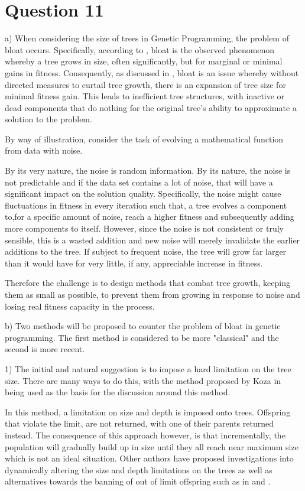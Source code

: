 \documentclass[12pt]{article}
\begin{document}
\section{Question 11}
a) When considering the size of trees in Genetic Programming, the problem of bloat occurs. Specifically, according to \cite{poli_langdon_mcphee_koza_2008}, bloat is the observed phenomenon whereby a tree grows in size, often significantly, but for marginal or minimal gains in fitness. Consequently, as discussed in \cite{Trujillo2013}, bloat is an issue whereby without directed measures to curtail tree growth, there is an expansion of tree size for minimal fitness gain. This leads to inefficient tree structures, with inactive or dead components that do nothing for the original tree's ability to approximate a solution to the problem.

	By way of illustration, consider the task of evolving a mathematical function from data with noise.

	By its very nature, the noise is random information. By its nature, the noise is not predictable and if the data set contains a lot of noise, that will have a significant impact on the solution quality. Specifically, the noise might cause fluctuations in fitness in every iteration such that, a tree evolves a component to,for a specific amount of noise, reach a higher fitness and subsequently adding more components to itself. However, since the noise is not consistent or truly sensible, this is a wasted addition and new noise will merely invalidate the earlier additions to the tree. If subject to frequent noise, the tree will grow far larger than it would have for very little, if any, appreciable increase in fitness. 

	Therefore the challenge is to design methods that combat tree growth, keeping them as small as possible, to prevent them from growing in response to noise and losing real fitness capacity in the process.

	b) Two methods will be proposed to counter the problem of bloat in genetic programming.
	The first method is considered to be more "classical" and the second is more recent.


		1) The initial and natural suggestion is to impose a hard limitation on the tree size. There are many ways to do this, with the method proposed by Koza in \cite{koza_1994} being used as the basis for the discussion around this method. 

		In this method, a limitation on size and depth is imposed onto trees. Offspring that violate the limit, are not returned, with one of their parents returned instead. The consequence of this approach however, is that incrementally, the population will gradually build up in size until they all reach near maximum size which is not an ideal situation. Other authors have proposed investigations into dynamically altering the size and depth limitations on the trees as well as alternatives towards the banning of out of limit offspring such as in \cite{silva_costa_2005} and \cite{silva_silva_costa_2005}.
\end{document}
